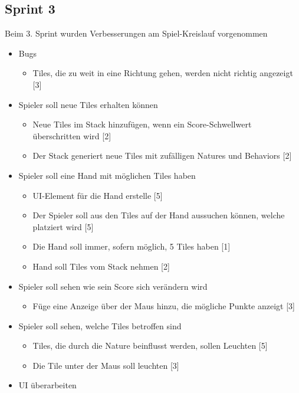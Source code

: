 \documentclass[../main.tex]{subfiles}
\begin{document}
	\newpage
	\subsection{Sprint 3}
	
	\par Beim 3. Sprint wurden Verbesserungen am Spiel-Kreislauf vorgenommen
	
	\begin{itemize}
		\item Bugs
		\begin{itemize}
			\item Tiles, die zu weit in eine Richtung gehen, werden nicht richtig angezeigt [3]
		\end{itemize}
		\item Spieler soll neue Tiles erhalten können
		\begin{itemize}
			\item Neue Tiles im Stack hinzufügen, wenn ein Score-Schwellwert überschritten wird [2]
			\item Der Stack generiert neue Tiles mit zufälligen Natures und Behaviors [2]
		\end{itemize}
		\item Spieler soll eine Hand mit möglichen Tiles haben
		\begin{itemize}
			\item UI-Element für die Hand erstelle [5]
			\item Der Spieler soll aus den Tiles auf der Hand aussuchen können, welche platziert wird [5]
			\item Die Hand soll immer, sofern möglich, 5 Tiles haben [1]
			\item Hand soll Tiles vom Stack nehmen [2]
		\end{itemize}
		\item Spieler soll sehen wie sein Score sich verändern wird
		\begin{itemize}
			\item Füge eine Anzeige über der Maus hinzu, die mögliche Punkte anzeigt [3]
		\end{itemize}
		\item Spieler soll sehen, welche Tiles betroffen sind
		\begin{itemize}
			\item Tiles, die durch die Nature beinflusst werden, sollen Leuchten [5]
			\item Die Tile unter der Maus soll leuchten [3]
		\end{itemize}
		\item UI überarbeiten

\end{itemize}
\end{document}

